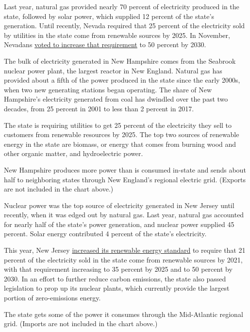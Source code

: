 Last year, natural gas provided nearly 70 percent of electricity
produced in the state, followed by solar power, which supplied 12
percent of the state's generation. Until recently, Nevada required that
25 percent of the electricity sold by utilities in the state come from
renewable sources by 2025. In November, Nevadans
\href{https://grist.org/article/why-nevada-upped-its-renewable-energy-standards-and-arizona-didnt/}{voted
to increase that requirement} to 50 percent by 2030.

The bulk of electricity generated in New Hampshire comes from the
Seabrook nuclear power plant, the largest reactor in New England.
Natural gas has provided about a fifth of the power produced in the
state since the early 2000s, when two new generating stations began
operating. The share of New Hampshire's electricity generated from coal
has dwindled over the past two decades, from 25 percent in 2001 to less
than 2 percent in 2017.

The state is requiring utilities to get 25 percent of the electricity
they sell to customers from renewable resources by 2025. The top two
sources of renewable energy in the state are biomass, or energy that
comes from burning wood and other organic matter, and hydroelectric
power.

New Hampshire produces more power than is consumed in-state and sends
about half to neighboring states through New England's regional electric
grid. (Exports are not included in the chart above.)

Nuclear power was the top source of electricity generated in New Jersey
until recently, when it was edged out by natural gas. Last year, natural
gas accounted for nearly half of the state's power generation, and
nuclear power supplied 45 percent. Solar energy contributed 4 percent of
the state's electricity.

This year, New Jersey
\href{https://www.nytimes3xbfgragh.onion/2018/04/12/nyregion/new-jersey-renewable-energy.html}{increased
its renewable energy standard} to require that 21 percent of the
electricity sold in the state come from renewable sources by 2021, with
that requirement increasing to 35 percent by 2025 and to 50 percent by
2030. In an effort to further reduce carbon emissions, the state also
passed legislation to prop up its nuclear plants, which currently
provide the largest portion of zero-emissions energy.

The state gets some of the power it consumes through the Mid-Atlantic
regional grid. (Imports are not included in the chart above.)

